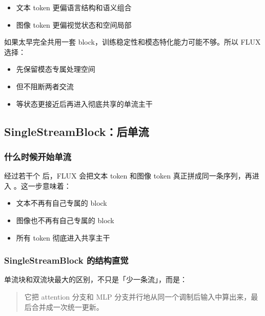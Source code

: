 \begin{itemize}[leftmargin=1.5em]
  \item 文本 token 更偏语言结构和语义组合
  \item 图像 token 更偏视觉状态和空间局部
\end{itemize}

如果太早完全共用一套 block，训练稳定性和模态特化能力可能不够。所以 FLUX 选择：

\begin{itemize}[leftmargin=1.5em]
  \item 先保留模态专属处理空间
  \item 但不阻断两者交流
  \item 等状态更接近后再进入彻底共享的单流主干
\end{itemize}

\subsection{SingleStreamBlock：后单流}

\subsubsection{什么时候开始单流}

经过若干个  后，FLUX 会把文本 token 和图像 token 真正拼成同一条序列，再进入 。这一步意味着：

\begin{itemize}[leftmargin=1.5em]
  \item 文本不再有自己专属的 block
  \item 图像也不再有自己专属的 block
  \item 所有 token 彻底进入共享主干
\end{itemize}

\subsubsection{SingleStreamBlock 的结构直觉}

单流块和双流块最大的区别，不只是「少一条流」，而是：

\begin{quote}
它把 attention 分支和 MLP 分支并行地从同一个调制后输入中算出来，最后合并成一次统一更新。
\end{quote}

